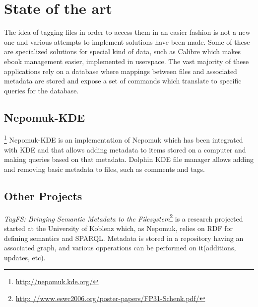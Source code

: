 


\section{State of the art}

The idea of tagging files in order to access them in an easier fashion is not
a new one and various attempts to implement solutions have been made. Some of
these are specialized solutions for special kind of data, such as Calibre
which makes ebook management easier, implemented in userspace. The vast majority
of these applications rely on a database where mappings between files and 
associated metadata are stored and expose a set of commands which translate
to specific queries for the database.  

\subsection{Nepomuk-KDE}\footnote{\url{http://nepomuk.kde.org/}}
Nepomuk-KDE is an implementation of Nepomuk which has been integrated with KDE
and that allows adding metadata to items stored on a computer and making 
queries based on that metadata.
Dolphin KDE file manager allows adding and removing basic metadata to files,
such as comments and tags.

\subsection{Other Projects}
\textit{TagFS: Bringing Semantic Metadata to the Filesystem}\footnote{ \url{http:
//www.eswc2006.org/poster-papers/FP31-Schenk.pdf/}} is a research projected
started at the University of Koblenz which, as Nepomuk, relies on RDF for
defining semantics and SPARQL. Metadata is stored in a repository having an
associated graph, and various opperations can be performed on it(additions, updates, etc).



